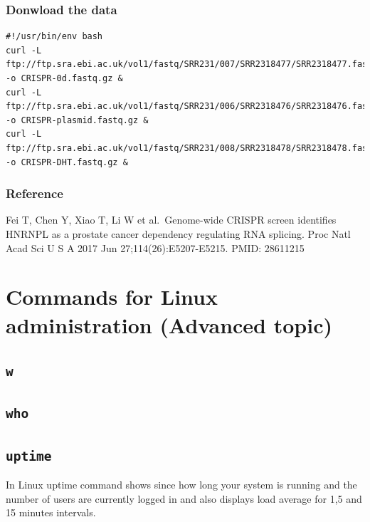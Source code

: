 \documentclass[]{book}
\begin{document}
\hypertarget{donwload-the-data-1}{%
\subsection{Donwload the data}\label{donwload-the-data-1}}

\begin{verbatim}
#!/usr/bin/env bash
curl -L ftp://ftp.sra.ebi.ac.uk/vol1/fastq/SRR231/007/SRR2318477/SRR2318477.fastq.gz -o CRISPR-0d.fastq.gz &
curl -L ftp://ftp.sra.ebi.ac.uk/vol1/fastq/SRR231/006/SRR2318476/SRR2318476.fastq.gz -o CRISPR-plasmid.fastq.gz &
curl -L ftp://ftp.sra.ebi.ac.uk/vol1/fastq/SRR231/008/SRR2318478/SRR2318478.fastq.gz -o CRISPR-DHT.fastq.gz &
\end{verbatim}

\hypertarget{reference-1}{%
\subsection{Reference}\label{reference-1}}

Fei T, Chen Y, Xiao T, Li W et al.~Genome-wide CRISPR screen identifies HNRNPL as a prostate cancer dependency regulating RNA splicing. Proc Natl Acad Sci U S A 2017 Jun 27;114(26):E5207-E5215. PMID: 28611215

\hypertarget{commands-for-linux-administration-advanced-topic}{%
\chapter{Commands for Linux administration (Advanced topic)}\label{commands-for-linux-administration-advanced-topic}}

\hypertarget{w}{%
\section{\texorpdfstring{\texttt{w}}{w}}\label{w}}

\hypertarget{who}{%
\section{\texorpdfstring{\texttt{who}}{who}}\label{who}}

\hypertarget{uptime}{%
\section{\texorpdfstring{\texttt{uptime}}{uptime}}\label{uptime}}

In Linux uptime command shows since how long your system is running and the number of users are currently logged in and also displays load average for 1,5 and 15 minutes intervals.
\end{document}

